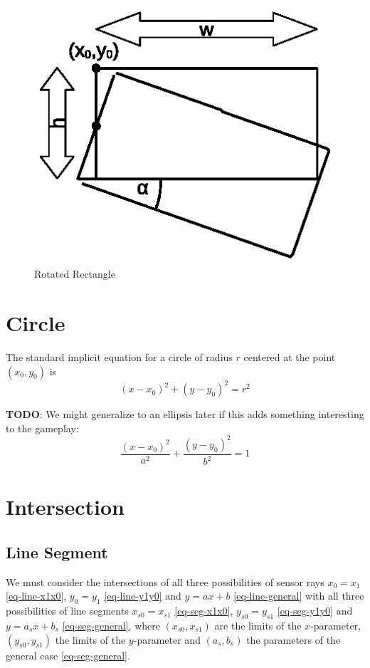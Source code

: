 \documentclass[11pt]{article}
\newcommand{\TODO}{{\bf TODO}}
\begin{document}
\begin{figure}
    \centering
    \includegraphics[trim=10 40 10 20]{rectangle.eps}
    \caption{Rotated Rectangle}\label{fig-rectangle}
\end{figure}

\section{Circle}
\label{sec-circle}

The standard implicit equation for a circle of radius $r$  centered at the 
point $(x_0, y_0)$ is
\begin{equation}
    (x - x_0)^2 + (y - y_0)^2 = r^2 
\end{equation}

\TODO: We might generalize to an ellipsis later if this adds something
interesting to the gameplay:
\begin{equation}
    \frac{(x-x_0)^2}{a^2} + \frac{(y-y_0)^2}{b^2} = 1
\end{equation}

\section{Intersection}
\label{sec-intersection}

\subsection{Line Segment}
\label{sec-intersection-line-segment}
We must consider the intersections of all three possibilities of sensor rays 
$x_0=x_1$ \eqref{eq-line-x1x0}, $y_0=y_1$ \eqref{eq-line-y1y0} and $y=ax+b$ 
\eqref{eq-line-general} with all three possibilities of line segments  
$x_{s0}=x_{s1}$ \eqref{eq-seg-x1x0}, $y_{s0}=y_{s1}$ \eqref{eq-seg-y1y0} and
$y=a_{s}x+b_{s}$ \eqref{eq-seg-general}, where $(x_{s0}, x_{s1})$ are the 
limits of the $x$-parameter, $(y_{s0}, y_{s1})$ the limits of the 
$y$-parameter and $(a_{s}, b_{s})$ the parameters of the general case 
\eqref{eq-seg-general}.
\end{document}
